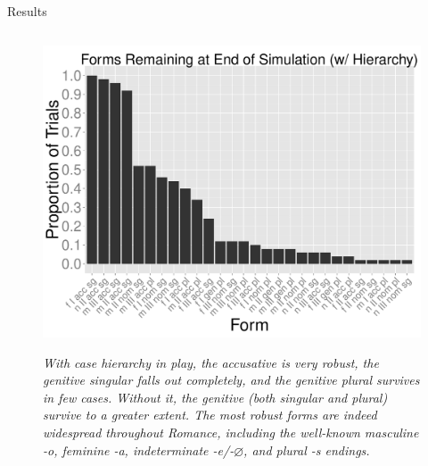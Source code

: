\documentclass[final]{beamer}
\newlength{\twocolwid}
\begin{document}
\begin{frame}[t]
\begin{columns}[t]
\begin{column}{\twocolwid}
\begin{block}{Results}
\begin{columns}[t]
%    
    \begin{column}{.33\linewidth}
    \begin{figure}
    \begin{center} 
	\vspace{2cm}
	{\centering \includegraphics[height=.2\textheight]{endforms_hierarchy.pdf}}
	 \footnotesize
	\caption{\textit{With case hierarchy in play, the accusative is very robust, the genitive singular falls out completely, and the genitive plural survives in few cases. Without it, the genitive (both singular and plural) survive to a greater extent. The most robust forms are indeed widespread throughout Romance, including the well-known masculine -o, feminine -a, indeterminate -e/-$\varnothing$, and plural -s endings.}}
	\end{center}
	\end{figure}
    \end{column}
    
%      
 

\end{columns}
\end{block}
\end{column}
\end{columns}
\end{frame}
\end{document}
